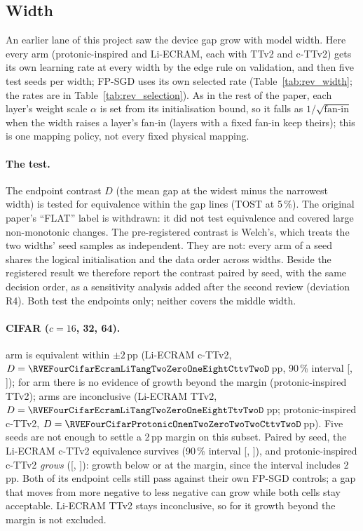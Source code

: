 \subsection{Width}\label{sec:scale}
An earlier lane of this project saw the device gap grow with model width. Here every arm (protonic-inspired and Li-ECRAM, each
with TTv2 and c-TTv2) gets its own learning rate at every width by the edge rule on validation, and then five test seeds per
width; FP-SGD uses its own selected rate (Table~\ref{tab:rev_width}; the rates are in Table~\ref{tab:rev_selection}). As in the
rest of the paper, each layer's weight scale $\alpha$ is set from its initialisation bound, so it falls as $1/\sqrt{\text{fan-in}}$
when the width raises a layer's fan-in (layers with a fixed fan-in keep theirs); this is one mapping policy, not every fixed
physical mapping.

\paragraph{The test.} The endpoint contrast $D$ (the mean gap at the widest minus the narrowest width) is tested for
equivalence within the gap lines (TOST at 5\,\%). The original paper's ``FLAT'' label is withdrawn: it did not test equivalence
and covered large non-monotonic changes. The pre-registered contrast is Welch's, which treats the two widths' seed samples as
independent. They are not: every arm of a seed shares the logical initialisation and the data order across widths. Beside the
registered result we therefore report the contrast paired by seed, with the same decision order, as a sensitivity analysis
added after the second review (deviation R4). Both test the endpoints only; neither covers the middle width.

\paragraph{CIFAR ($c=16$, 32, 64).} \RVEFourCifarNEquivalent{} arm is equivalent within $\pm2$\,pp (Li-ECRAM c-TTv2,
$D=\RVEFourCifarEcramLiTangTwoZeroOneEightCttvTwoD$\,pp, 90\,\% interval [\RVEFourCifarEcramLiTangTwoZeroOneEightCttvTwoLo,
\RVEFourCifarEcramLiTangTwoZeroOneEightCttvTwoHi]); for \RVEFourCifarNNoEvidenceOfGrowthBeyondTheMargin{} arm there is no evidence
of growth beyond the margin (protonic-inspired TTv2); \RVEFourCifarNInconclusive{} arms are inconclusive (Li-ECRAM TTv2,
$D=\RVEFourCifarEcramLiTangTwoZeroOneEightTtvTwoD$\,pp; protonic-inspired c-TTv2, $D=\RVEFourCifarProtonicOnenTwoZeroTwoTwoCttvTwoD$\,pp).
Five seeds are not enough to settle a 2\,pp margin on this subset. Paired by seed, the Li-ECRAM c-TTv2 equivalence survives
(90\,\% interval [\RVEFourCifarEcramLiTangTwoZeroOneEightCttvTwoPairedLo, \RVEFourCifarEcramLiTangTwoZeroOneEightCttvTwoPairedHi]),
and protonic-inspired c-TTv2 \emph{grows} ([\RVEFourCifarProtonicOnenTwoZeroTwoTwoCttvTwoPairedLo,
\RVEFourCifarProtonicOnenTwoZeroTwoTwoCttvTwoPairedHi]): growth below or at the margin, since the interval includes 2\,pp. Both of its
endpoint cells still pass against their own FP-SGD controls; a gap that moves from more negative to less negative can grow while
both cells stay acceptable. Li-ECRAM TTv2 stays inconclusive, so for it growth beyond the margin is not excluded.


